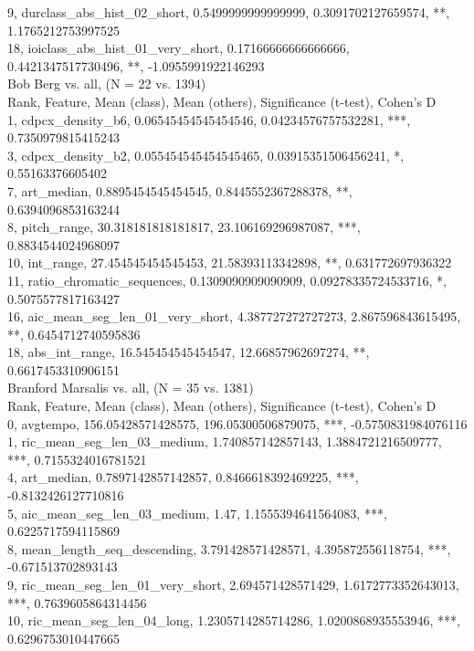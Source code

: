 9, durclass_abs_hist_02_short, 0.5499999999999999, 0.3091702127659574, **, 1.1765212753997525\\
18, ioiclass_abs_hist_01_very_short, 0.17166666666666666, 0.4421347517730496, **, -1.0955991922146293\\
Bob Berg vs. all, (N = 22 vs. 1394)\\
Rank, Feature, Mean (class), Mean (others), Significance (t-test), Cohen's D\\
1, cdpcx_density_b6, 0.06545454545454546, 0.04234576757532281, ***, 0.7350979815415243\\
3, cdpcx_density_b2, 0.055454545454545465, 0.03915351506456241, *, 0.55163376605402\\
7, art_median, 0.8895454545454545, 0.8445552367288378, **, 0.6394096853163244\\
8, pitch_range, 30.318181818181817, 23.106169296987087, ***, 0.8834544024968097\\
10, int_range, 27.454545454545453, 21.58393113342898, **, 0.631772697936322\\
11, ratio_chromatic_sequences, 0.1309090909090909, 0.09278335724533716, *, 0.5075577817163427\\
16, aic_mean_seg_len_01_very_short, 4.387727272727273, 2.867596843615495, **, 0.6454712740595836\\
18, abs_int_range, 16.545454545454547, 12.66857962697274, **, 0.6617453310906151\\
Branford Marsalis vs. all, (N = 35 vs. 1381)\\
Rank, Feature, Mean (class), Mean (others), Significance (t-test), Cohen's D\\
0, avgtempo, 156.05428571428575, 196.05300506879075, ***, -0.5750831984076116\\
1, ric_mean_seg_len_03_medium, 1.740857142857143, 1.3884721216509777, ***, 0.7155324016781521\\
4, art_median, 0.7897142857142857, 0.8466618392469225, ***, -0.8132426127710816\\
5, aic_mean_seg_len_03_medium, 1.47, 1.1555394641564083, ***, 0.6225717594115869\\
8, mean_length_seq_descending, 3.791428571428571, 4.395872556118754, ***, -0.671513702893143\\
9, ric_mean_seg_len_01_very_short, 2.694571428571429, 1.6172773352643013, ***, 0.7639605864314456\\
10, ric_mean_seg_len_04_long, 1.2305714285714286, 1.0200868935553946, ***, 0.6296753010447665\\
